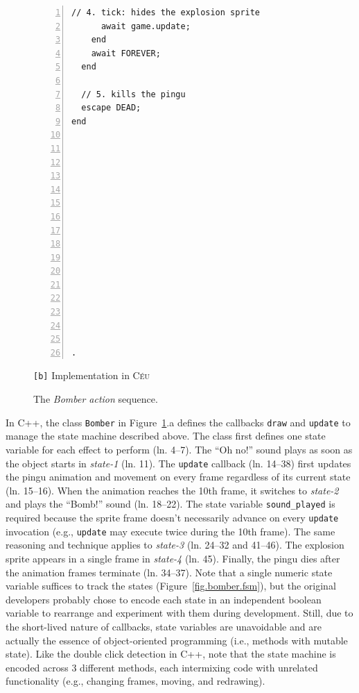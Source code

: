 \documentclass{vgtc}                          %
\newcommand{\CEU}{\textsc{C\'{e}u}\xspace}
\newcommand{\code}[1] {{\small{\texttt{#1}}}}
\newcommand{\bx}{\code{[b]}\xspace}
\begin{document}
\begin{figure}[!t]
\begin{minipage}[t]{0.50\linewidth}
\begin{lstlisting}[numbers=left,xleftmargin=3em]
      // 4. tick: hides the explosion sprite
      await game.update;
    end
    await FOREVER;
  end

  // 5. kills the pingu
  escape DEAD;
end
















.
\end{lstlisting}
\centering\small{\bx Implementation in \CEU}
\end{minipage}
\caption{ The \emph{Bomber action} sequence.
\label{lst.bomber}
}
\end{figure}

In C++, the class \code{Bomber} in Figure~\ref{lst.bomber}.a defines the
callbacks \code{draw} and \code{update} to manage the state machine described
above.
%
The class first defines one state variable for each effect to perform
(ln. 4--7).
The ``Oh no!'' sound plays as soon as the object starts in \emph{state-1} 
(ln. 11).
The \code{update} callback (ln. 14--38) first updates the pingu animation and
movement on every frame regardless of its current state (ln. 15--16).
When the animation reaches the 10th frame, it switches to \emph{state-2} and
plays the ``Bomb!'' sound (ln. 18--22).
The state variable \code{sound\_played} is required because the sprite frame
doesn't necessarily advance on every \code{update} invocation (e.g.,
\code{update} may execute twice during the 10th frame).
The same reasoning and technique applies to \emph{state-3} (ln. 24--32 and
41--46).
The explosion sprite appears in a single frame in \emph{state-4} (ln. 45).
Finally, the pingu dies after the animation frames terminate (ln. 34--37).
%
Note that a single numeric state variable suffices to track the states
(Figure~\ref{fig.bomber.fsm}), but the original developers probably chose to
encode each state in an independent boolean 
variable to rearrange and experiment with them during development.
Still, due to the short-lived nature of callbacks, state variables are 
unavoidable and are actually the essence of object-oriented programming
(i.e., methods with mutable state).
%
Like the double click detection in C++, note that the state machine is encoded
across 3 different methods, each intermixing code with unrelated functionality
(e.g., changing frames, moving, and redrawing).
\end{document}
